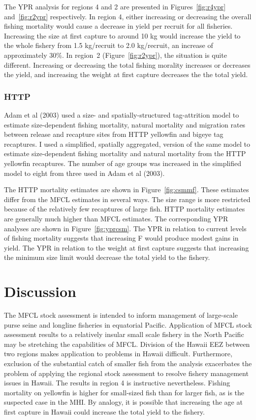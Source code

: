 \documentclass[12pt,letterpaper]{article}
\begin{document}
The YPR analysis for regions 4 and 2 are
presented in Figures~\ref{fig:r4ypr} and~\ref{fig:r2ypr} respectively.
In region 4, either increasing or decreasing the overall fishing
mortality would cause a decrease in yield per recruit for all
fisheries.
Increasing the size at first capture to around 10 kg would increase the
yield to the whole fishery from 1.5 kg/recruit to 2.0
kg/recruit, an increase of approximately 30\%.
In region~2 (Figure~\ref{fig:r2ypr}), the situation is quite different. 
Increasing or decreasing the total fishing morality increases
or decreases the yield, and
increasing the weight at first capture decreases the
the total yield.

\subsubsection*{HTTP}
Adam et al (2003) used a size- and spatially-structured
tag-attrition model to estimate
size-dependent fishing mortality, natural
mortality and migration rates between release and recapture sites from
HTTP yellowfin and bigeye tag recaptures. 
I used a simplified, spatially aggregated, version of the same
model to estimate size-dependent fishing
mortality and natural mortality from the HTTP yellowfin recaptures.
The number of age groups was increased in the simplified model
to eight from three used in Adam et al (2003).

The HTTP mortality estimates are shown in Figure~\ref{fig:csmmf}.
These estimates differ from the MFCL estimates in several ways. The
size range is more restricted because of the relatively few
recaptures of large fish. HTTP mortality estimates
are generally much higher than MFCL estimates.
The corresponding YPR analyses are shown in Figure~\ref{fig:yprcsm}.
The YPR in relation to current levels of fishing mortality suggests
that increasing F would produce modest gains in yield.
The YPR in relation to the weight at first capture suggests that
increasing the minimum size limit would decrease the
total yield to the fishery.


\section*{Discussion}
The MFCL stock assessment is intended to inform management of
large-scale purse seine and longline fisheries in equatorial Pacific.
Application of MFCL stock assessment results to a relatively insular
small scale fishery in the North Pacific may be stretching the
capabilities of MFCL. Division of the Hawaii EEZ between two regions
makes application to problems in Hawaii difficult. Furthermore,
exclusion of the substantial catch of smaller fish from the analysis exacerbates
the problem of applying the regional stock assessment to
resolve fishery management issues in Hawaii. The results in region 4
is instructive nevertheless.
Fishing mortality on yellowfin is higher for small-sized fish than for
larger fish, as is the suspected case in the MHI. By analogy, it is
possible that increasing the age at first capture in Hawaii could increase
the total yield to the fishery. 
\end{document}
